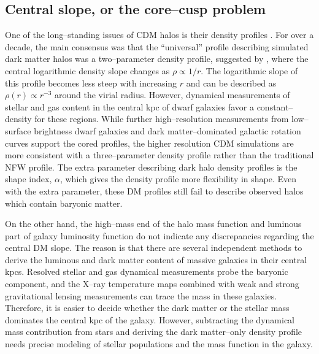 \documentclass[a4wide,12pt]{book}
\newcommand{\ignore}[1]{}
\begin{document}
{\subsection{Central slope, or the core--cusp problem}
\label{subsec:core-cusp}
One of the long--standing issues of CDM halos is their density profiles \citep[][]{Dubinski.Carlberg1991, Walker.Penarrubia2011}. For over a decade, the main consensus was that the ``universal'' profile describing simulated dark matter halos was a two--parameter density profile, suggested by \citet[][ hereafter NFW]{NFW}, where the central logarithmic density slope changes as $\rho \propto 1/r$. The logarithmic slope of this profile becomes less steep with increasing $r$ and can be described as $\rho(r) \propto r^{-3}$ around the virial radius. However, dynamical measurements of stellar and gas content in the central kpc of dwarf galaxies \citep[][]{} favor a constant--density for these regions. While further high--resolution measurements from low--surface brightness dwarf galaxies and dark matter--dominated galactic rotation curves support the cored profiles, the higher resolution CDM simulations are more consistent with a three--parameter density profile rather than the traditional NFW profile. The extra parameter describing dark halo density profiles is the shape index, $\alpha$, which gives the density profile more flexibility in shape. Even with the extra parameter, these DM profiles still fail to describe observed halos which contain baryonic matter. 

On the other hand, the high--mass end of the halo mass function and luminous part of galaxy luminosity function do not indicate any discrepancies regarding the central DM slope. The reason is that there are several independent methods to derive the luminous and dark matter content of massive galaxies in their central kpcs. Resolved stellar and gas dynamical measurements probe the baryonic component\ignore{ \citep[][]{}}, and the X--ray temperature maps combined with weak and strong gravitational lensing measurements can trace the mass in these galaxies\ignore{ \citep[][]{}}. Therefore, it is easier to decide whether the dark matter or the stellar mass dominates the central kpc of the galaxy. 
 However, subtracting the dynamical mass contribution from stars and deriving the dark matter--only density profile needs precise modeling of stellar populations and the mass function in the galaxy. 

}
\end{document}
